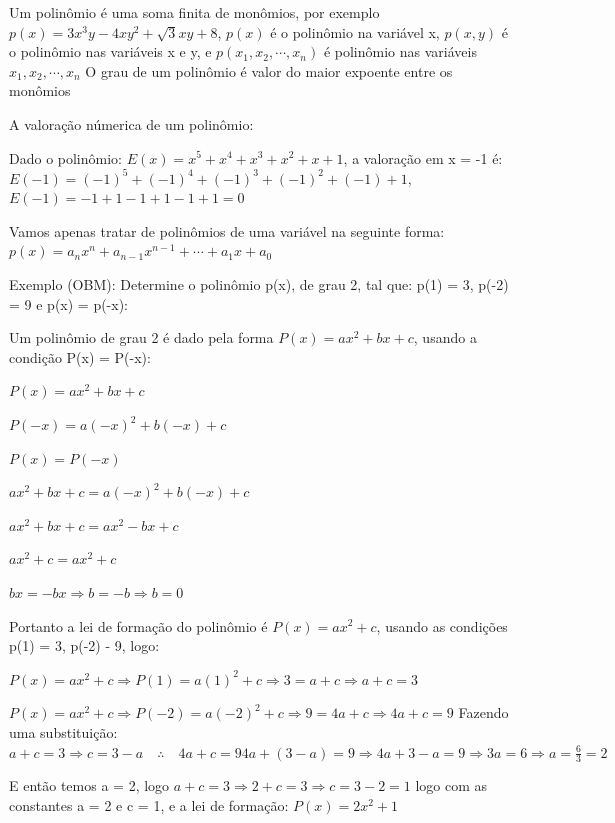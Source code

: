 \begin{multicols*}{2}
\begin{itemize}
    \end{itemize}
    Um polinômio é uma soma finita de monômios, por exemplo
    $p(x) = 3x^3y - 4xy^2 + \sqrt{3}xy + 8$, $p(x)$ é o polinômio na variável x, $p(x,y)$ é o 				polinômio nas variáveis x e y, e $p(x_1, x_2, \cdots, x_n)$ é polinômio nas variáveis $x_1, 			x_2, \cdots, x_n$
    O grau de um polinômio é valor do maior expoente entre os monômios

    A valoração númerica de um polinômio:

    Dado o polinômio: $E(x) = x^5 + x^4 + x^3 + x^2 + x + 1$, a valoração em x = -1 é:
    $E(-1) = (-1)^5 + (-1)^4 + (-1)^3 + (-1)^2 + (-1) + 1$,
    $E(-1) = -1 + 1 - 1 + 1 -1 +1  = 0$

    Vamos apenas tratar de polinômios de uma variável na seguinte forma:
    $p(x) = a_nx^n + a_{n-1}x^{n-1} + \cdots + a_1x + a_0$

    Exemplo (OBM):
    Determine o polinômio p(x), de grau 2, tal que: p(1) = 3, p(-2) = 9 e p(x) = p(-x):

    Um polinômio de grau 2 é dado pela forma $P(x) = ax^2 + bx + c $, usando a condição
    P(x) = P(-x):

    $P(x) = ax^2 + bx + c$

    $P(-x) = a(-x)^2 + b(-x) + c$

    $P(x) = P(-x)$

    $ax^2 + bx + c = a(-x)^2 + b(-x) + c$

    $ax^2 + bx + c = ax^2  - bx + c$

    $ax^2 + c = ax^2 + c$

    $bx = -bx \Rightarrow b = -b \Rightarrow b =0$

    Portanto a lei de formação do polinômio é $P(x) = ax^2 + c$, usando as condições  p(1) = 3, 			p(-2) - 9, logo:

    $P(x) = ax^2 + c \Rightarrow P(1) = a(1)^2 + c \Rightarrow 3 = a + c \Rightarrow a+c = 3$

    $P(x) = ax^2 + c \Rightarrow P(-2) = a(-2)^2 + c \Rightarrow 9 = 4a + c \Rightarrow 4a+c = 9$
    Fazendo uma substituição: $a + c = 3 \Rightarrow c = 3 - a \quad \therefore \quad 4a +c = 9
        4a + (3-a) = 9 \Rightarrow 4a +3 -a = 9 \Rightarrow 3a = 6 \Rightarrow a = \frac{6}{3}  = 2$

    E então temos a = 2, logo $a+c = 3 \Rightarrow 2 + c = 3 \Rightarrow c = 3 - 2 = 1$ logo com as 		constantes a = 2 e c = 1, e a lei de formação: $P(x) = 2x^2 + 1$


\end{multicols*}
